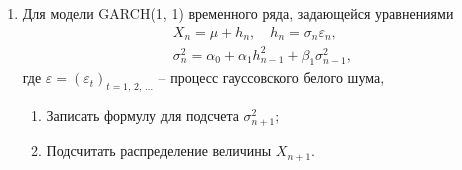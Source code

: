 \documentclass[a4paper,12pt]{extreport}
\renewcommand{\=}[1]{\stackrel{#1}{=}} %
\newcommand{\generaltime}{t \geqslant 0}
\newcommand{\discretetime}{t = 1,\,2,\,\ldots}
\newcommand{\newprocess}[1]{
    \ensuremath{
        #1 = \left(#1 _t\right)_{\generaltime}
    }
}
\newcommand{\newprocessd}[1]{
    \ensuremath{
        #1 = \left(#1 _t\right)_{\discretetime}
    }
}
\begin{document}
\begin{enumerate}


    \item Для модели GARCH(1, 1) временного ряда, задающейся уравнениями
    \begin{align*}
    X_n = \mu + h_n, 
    \quad 
    h_n = \sigma_n \varepsilon_n, \\
    \sigma_n^2 = \alpha_0 + \alpha_1 h_{n-1}^2 + \beta_1 \sigma_{n-1}^2,
    \end{align*}
    где $\newprocessd{\varepsilon}$ -- процесс гауссовского белого шума,

    \begin{enumerate}
    \item Записать формулу для подсчета $\sigma^2_{n+1}$;
    \item Подсчитать распределение величины $X_{n+1}$.
    \end{enumerate}

\end{enumerate}
\end{document}

